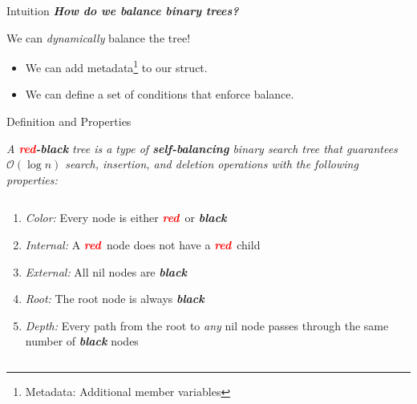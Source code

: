 \documentclass[aspectratio=169]{beamer}
\newcommand{\textib}[1]{\textit{\textbf{{#1}}}}
\newcommand{\red}{\textib{\textcolor{red}{red}}}
\newcommand{\define}[1]{\begin{tcolorbox}[title={Definition}]\small{\textit{{#1}}}\end{tcolorbox}}
\begin{document}
\begin{frame}{Intuition}
    \textib{How do we balance binary trees?} \vspace{1em}

    \noindent We can \textit{dynamically} balance the tree!
    \begin{itemize}[label=$\to$]
        \item We can add metadata\footnote{Metadata: Additional member variables} to our 
             struct.
        \item We can define a set of conditions that enforce balance.
    \end{itemize}
\end{frame}


\begin{frame}[label=def,fragile]{Definition and Properties}
    \define {
        A \red\textib{-black} tree is a type of \textib{self-balancing} binary 
        search tree that guarantees $\mathcal{O}(\log n)$ search, insertion, and deletion operations
        with the following properties:
    }
    \begin{columns}
        \begin{column}{.5\textwidth}
            \begin{adjustbox}{valign=T, minipage=[t]{\textwidth}}
                \begin{enumerate}[label=\textit{(\roman*)}]
                    \item<1> \textit{Color:} Every node is either \red \ or \textib{black}
                    \item<2> \textit{Internal:} A \red \ node does not have a \red \ child
                    \item<3> \textit{External:} All nil nodes are \textib{black}
                    \item<4> \textit{Root:} The root node is always \textib{black}
                    \item<5> \textit{Depth:} Every path from the root to \textit{any} nil node 
                        passes through the same number of \textib{black} nodes
                \end{enumerate}
            \end{adjustbox}
        \end{column}

        \begin{column}{.5\textwidth}
        \end{column}
    \end{columns}
\end{frame}
\end{document}
